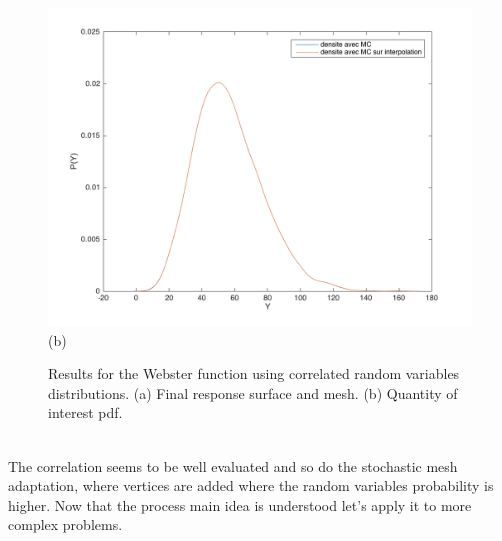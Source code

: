 \documentclass[11pt, a4paper, English]{report}
\begin{document}
\begin{appendix}
\begin{figure}[h!]
\begin{minipage}[t]{0.5\textwidth}
        \includegraphics[width=\textwidth]{Webster_cor2.png}
       (b)
    \end{minipage}
    \caption{Results for the Webster function using correlated random variables distributions. (a) Final response surface and mesh. (b) Quantity of interest pdf.}
\end{figure}\\
The correlation seems to be well evaluated and so do the stochastic mesh adaptation, where vertices are added where the random variables probability is higher. Now that the process main idea is understood let's apply it to more complex problems. 

\end{appendix}
\end{document}
